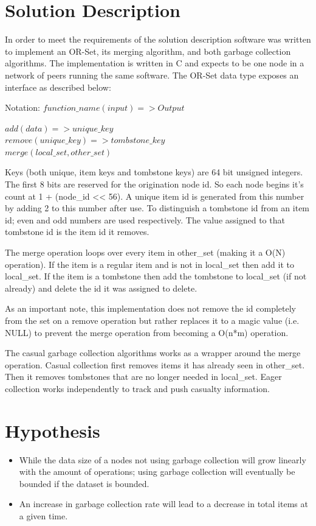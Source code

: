 \documentclass{article}
\begin{document}
\begin{multicols}{2}
\begin{refsection}
\section*{Solution Description}

In order to meet the requirements of the solution description software
was written to implement an OR-Set, its merging algorithm, and both
garbage collection algorithms. The implementation is written in C and
expects to be one node in a network of peers running the same software.
The OR-Set data type exposes an interface as described below:

Notation:
$ function\_name(input) => Output $

$ add(data) => unique\_key $ \\
$ remove(unique\_key) => tombstone\_key $ \\
$ merge(local\_set, other\_set) $

Keys (both unique, item keys and tombstone keys) are 64 bit unsigned
integers. The first 8 bits are reserved for the origination node id. So
each node begins it's count at 1 + (node\_id << 56). A unique item id is
generated from this number by adding 2 to this number after use. To
distinguish a tombstone id from an item id; even and odd numbers are
used respectively. The value assigned to that tombstone id is the item
id it removes.

The merge operation loops over every item in other\_set (making it a
O(N) operation). If the item is a regular item and is not in local\_set
then add it to local\_set. If the item is a tombstone then add the
tombstone to local\_set (if not already) and delete the id it was
assigned to delete.

As an important note, this implementation does not remove the id
completely from the set on a remove operation but rather replaces it to
a magic value (i.e. NULL) to prevent the merge operation from becoming
a O(n*m) operation.

The casual garbage collection algorithms works as a wrapper around the merge
operation. Casual collection first removes items it has already seen in
other\_set. Then it removes tombstones that are no longer needed in
local\_set. Eager collection works independently to track and push
casualty information.

\section*{Hypothesis}

\begin{itemize}
    \item While the data size of a nodes not using garbage collection will
          grow linearly with the amount of operations; using garbage collection
          will eventually be bounded if the dataset is bounded.
    \item An increase in garbage collection rate will lead to a decrease in
          total items at a given time.
\end{itemize}


\end{refsection}
\end{multicols}
\end{document}
